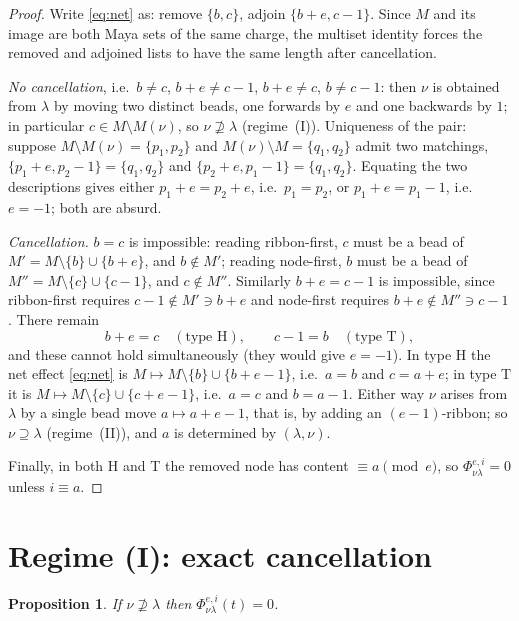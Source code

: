 \documentclass[11pt]{article}
\theoremstyle{plain}
\newtheorem{proposition}[theorem]{Proposition}
\theoremstyle{definition}
\begin{document}
\begin{proof}
Write \eqref{eq:net} as: remove $\{b,c\}$, adjoin $\{b+e,c-1\}$. Since $M$ and its
image are both Maya sets of the same charge, the multiset identity forces the
removed and adjoined lists to have the same length after cancellation.

\emph{No cancellation}, i.e.\ $b\ne c$, $b+e\ne c-1$, $b+e\ne c$, $b\ne c-1$:
then $\nu$ is obtained from $\lambda$ by moving two distinct beads, one forwards by
$e$ and one backwards by $1$; in particular $c\in M\setminus M(\nu)$, so
$\nu\not\supseteq\lambda$ (regime~(I)). Uniqueness of the pair: suppose
$M\setminus M(\nu)=\{p_1,p_2\}$ and $M(\nu)\setminus M=\{q_1,q_2\}$ admit two
matchings, $\{p_1+e,p_2-1\}=\{q_1,q_2\}$ and $\{p_2+e,p_1-1\}=\{q_1,q_2\}$. Equating
the two descriptions gives either $p_1+e=p_2+e$, i.e.\ $p_1=p_2$, or $p_1+e=p_1-1$,
i.e.\ $e=-1$; both are absurd.

\emph{Cancellation.} $b=c$ is impossible: reading ribbon-first, $c$ must be a bead of
$M'=M\setminus\{b\}\cup\{b+e\}$, and $b\notin M'$; reading node-first, $b$ must be a
bead of $M''=M\setminus\{c\}\cup\{c-1\}$, and $c\notin M''$. Similarly
$b+e=c-1$ is impossible, since ribbon-first requires $c-1\notin M'\ni b+e$ and
node-first requires $b+e\notin M''\ni c-1$. There remain
\[
b+e=c\quad(\text{type H}),\qquad c-1=b\quad(\text{type T}),
\]
and these cannot hold simultaneously (they would give $e=-1$). In type H the net
effect \eqref{eq:net} is $M\mapsto M\setminus\{b\}\cup\{b+e-1\}$, i.e.\ $a=b$ and
$c=a+e$; in type T it is $M\mapsto M\setminus\{c\}\cup\{c+e-1\}$, i.e.\ $a=c$ and
$b=a-1$. Either way $\nu$ arises from $\lambda$ by a single bead move
$a\mapsto a+e-1$, that is, by adding an $(e-1)$-ribbon; so $\nu\supseteq\lambda$
(regime~(II)), and $a$ is determined by $(\lambda,\nu)$.

Finally, in both H and T the removed node has content $\equiv a\pmod e$, so
$\Phi^{e,i}_{\nu\lambda}=0$ unless $i\equiv a$.
\end{proof}

\section{Regime (I): exact cancellation}

\begin{proposition}\label{prop:regimeI}
If $\nu\not\supseteq\lambda$ then $\Phi^{e,i}_{\nu\lambda}(t)=0$.
\end{proposition}
\end{document}
